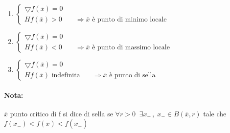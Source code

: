 \documentclass[12pt]{article}
\begin{document}
\begin{enumerate}
    \item $
              \begin{cases}
                  \bigtriangledown f(\overline{x}) = 0                                                      \\
                  Hf(\overline{x}) > 0 & \quad\Longrightarrow \overline{x} \text{ è punto di minimo locale}
              \end{cases}
          $
    \item $
              \begin{cases}
                  \bigtriangledown f(\overline{x}) = 0                                                       \\
                  Hf(\overline{x}) < 0 & \quad\Longrightarrow \overline{x} \text{ è punto di massimo locale}
              \end{cases}
          $
    \item $
              \begin{cases}
                  \bigtriangledown f(\overline{x}) = 0                                                             \\
                  Hf(\overline{x}) \text{ indefinita} & \quad\Longrightarrow \overline{x} \text{ è punto di sella}
              \end{cases}
          $
\end{enumerate}

\paragraph*{Nota:}
$\overline{x}$ punto critico di f si dice di sella se $\forall r > 0\;\; \exists x_+\,,\; x_- \in B(\overline{x}, r)$
tale che $f(x_-) < f(\overline{x}) < f(x_+)$
\end{document}

